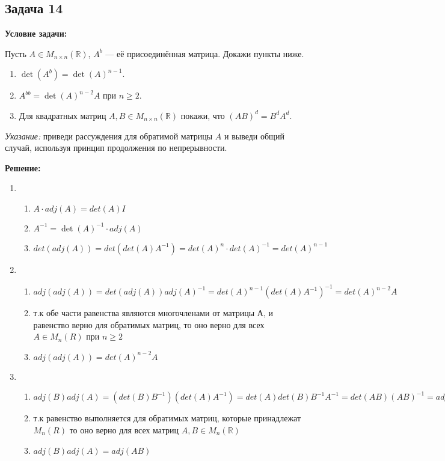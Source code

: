 \documentclass[a4paper,12pt]{article}
\begin{document}
\vspace{1cm}

\subsection{Задача 14}

\textbf{Условие задачи:}

Пусть \( A \in M_{n \times n}(\mathbb{R}) \), \( A^b \) — её присоединённая матрица. Докажи пункты ниже.

\begin{enumerate}
    \item \( \det(A^b) = \det(A)^{n - 1} \).
    \item \( A^{bb} = \det(A)^{n - 2} A \) при \( n \geq 2 \).
    \item Для квадратных матриц \( A, B \in M_{n \times n}(\mathbb{R}) \) покажи, что \( (AB)^d = B^d A^d \).
\end{enumerate}

\textit{Указание:} приведи рассуждения для обратимой матрицы \( A \) и выведи общий случай, используя принцип продолжения по непрерывности.

\textbf{Решение:}

\begin{enumerate}
    \item   \begin{enumerate}
                \item $A\cdot adj(A)=det(A)I$
                \item $A^{-1}=\det(A)^{-1}\cdot adj(A)$
                \item $det(adj(A))=det(det(A)A^{-1})=det(A)^n\cdot det(A)^{-1}=det(A)^{n-1}$
            \end{enumerate}
    \item   \begin{enumerate}
                \item $adj(adj(A))=det(adj(A))adj(A)^{-1}=det(A)^{n-1}(det(A)A^{-1})^{-1}=det(A)^{n-2}A$
                \item т.к обе части равенства являются многочленами от матрицы А, и равенство верно для обратимых матриц, то оно верно для всех $A \in M_n(R)$ при $n \ge 2$
                \item $adj(adj(A))=det(A)^{n-2}A$
            \end{enumerate}
    \item   \begin{enumerate}
                \item $adj(B)adj(A)=(det(B)B^{-1})(det(A)A^{-1})=det(A)det(B)B^{-1}A^{-1}=det(AB)(AB)^{-1}=adj(AB)$
                \item т.к равенство выполняется для обратимых матриц, которые принадлежат $M_n(R)$ то оно верно для всех матриц $A,B\in M_n(\mathbb{R})$
                \item $adj(B)adj(A)=adj(AB)$
            \end{enumerate}
\end{enumerate}

\vspace{1cm}
\end{document}
